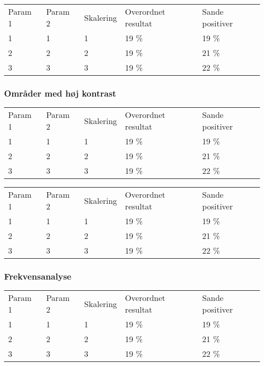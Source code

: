 \begin{tabular}{|l|l|l|l|l|}
\hline
\rowcolor[gray]{0.9} \multicolumn{5}{|>{\columncolor[gray]{0.9}}c|}{\textbf{Kontrolsæt}} \\ \hline
Param 1 & Param 2 & Skalering & Overordnet resultat & Sande positiver\\ \hline
1 & 1 & 1 & 19 \% & 19 \%\\ \hline
2 & 2 & 2 & 19 \% & 21 \% \\ \hline
3 & 3 & 3 & 19 \% & 22 \% \\
\hline
\end{tabular}

\subsubsection*{Områder med høj kontrast}

\begin{tabular}{|l|l|l|l|l|}
\hline
\rowcolor[gray]{0.9} \multicolumn{5}{|>{\columncolor[gray]{0.9}}c|}{\textbf{Træningssæt}} \\ \hline
Param 1 & Param 2 & Skalering & Overordnet resultat & Sande positiver\\ \hline
1 & 1 & 1 & 19 \% & 19 \%\\ \hline
2 & 2 & 2 & 19 \% & 21 \% \\ \hline
3 & 3 & 3 & 19 \% & 22 \% \\
\hline
\end{tabular}

\begin{tabular}{|l|l|l|l|l|}
\hline
\rowcolor[gray]{0.9} \multicolumn{5}{|>{\columncolor[gray]{0.9}}c|}{\textbf{Kontrolsæt}} \\ \hline
Param 1 & Param 2 & Skalering & Overordnet resultat & Sande positiver\\ \hline
1 & 1 & 1 & 19 \% & 19 \%\\ \hline
2 & 2 & 2 & 19 \% & 21 \% \\ \hline
3 & 3 & 3 & 19 \% & 22 \% \\
\hline
\end{tabular}

\subsubsection*{Frekvensanalyse}

\begin{tabular}{|l|l|l|l|l|}
\hline
\rowcolor[gray]{0.9} \multicolumn{5}{|>{\columncolor[gray]{0.9}}c|}{\textbf{Træningssæt}} \\ \hline
Param 1 & Param 2 & Skalering & Overordnet resultat & Sande positiver\\ \hline
1 & 1 & 1 & 19 \% & 19 \%\\ \hline
2 & 2 & 2 & 19 \% & 21 \% \\ \hline
3 & 3 & 3 & 19 \% & 22 \% \\
\hline
\end{tabular}

